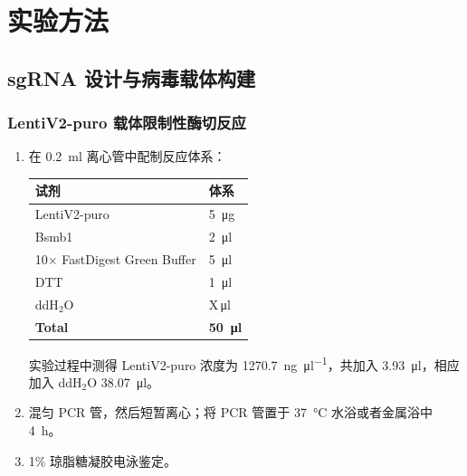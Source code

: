 \section{实验方法}
\subsection{sgRNA 设计与病毒载体构建}
\subsubsection{LentiV2-puro 载体限制性酶切反应}
\begin{enumerate}
    \item 在 \qty{0.2}{\ml} 离心管中配制反应体系：
    
    \begin{table}[H]
        \centering
        \begin{tabular}{C{5cm} C{5cm}}
            \toprule
            \textbf{试剂} & \textbf{体系} \\
            \midrule
            LentiV2-puro                         & \qty{5}{\ug} \\
            Bsmb1                                & \qty{2}{\ul} \\
            10\(\times\) FastDigest Green Buffer & \qty{5}{\ul} \\
            DTT                                  & \qty{1}{\ul} \\
            ddH$_2$O                             & X\,\si{\ul} \\
            \midrule
            \textbf{Total}              & \textbf{\qty{50}{\ul}} \\
            \bottomrule
        \end{tabular}
    \end{table}
    实验过程中测得 LentiV2-puro 浓度为 \qty{1270.7}{\ng\per\ul}，共加入 \qty{3.93}{\ul}，相应加入 ddH$_2$O \qty{38.07}{\ul}。
    \item 混匀 PCR 管，然后短暂离心；将 PCR 管置于 \qty{37}{\celsius} 水浴或者金属浴中 \qty{4}{\hour}。
    \item 1\% 琼脂糖凝胶电泳鉴定。
\end{enumerate}

